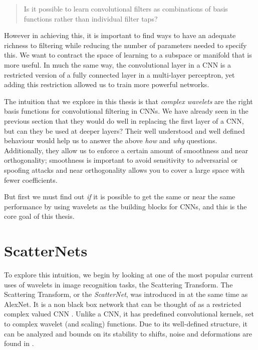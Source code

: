 \begin{quote}
  Is it possible to learn convolutional filters as 
  combinations of basis functions rather than individual filter taps?
\end{quote}

However in achieving this, it is important to find ways to have an adequate
richness to filtering while reducing the number of parameters needed to specify
this. We want to contract the space of learning to a subspace or manifold that 
is more useful. In much the same way, the convolutional layer in a CNN is a restricted
version of a fully connected layer in a multi-layer perceptron, yet adding this
restriction allowed us to train more powerful networks. 

The intuition that we explore in this thesis is that \emph{complex wavelets} are the
right basis functions for convolutional filtering in CNNs. We have already seen in the
previous section that they would do well in replacing the first layer of a CNN,
but can they be used at deeper layers? Their well understood and
well defined behaviour would help us to answer the above \emph{how} and \emph{why}
questions. Additionally, they allow us to enforce a certain amount of smoothness and near
orthogonality; smoothness is important to avoid sensitivity to adversarial or
spoofing attacks \cite{szegedy_intriguing_2014} and near orthogonality
allows you to cover a large space with fewer coefficients.

But first we must find out \emph{if} it is possible to get the same or near the same
performance by using wavelets as the building blocks for CNNs, and this is the
core goal of this thesis. 

\section{ScatterNets}
To explore this intuition, we begin by looking at one of the most
popular current uses of wavelets in image recognition tasks, the
Scattering Transform. 
The Scattering Transform, or the \emph{ScatterNet}, was introduced in \cite{mallat_group_2012,
bruna_invariant_2013} at the same time as AlexNet. It is a non black box
network that can be thought of as a restricted complex valued CNN
\cite{bruna_mathematical_2015}. Unlike a CNN, it has predefined
convolutional kernels, set to complex wavelet (and scaling) functions. Due to
its well-defined structure, it can be analyzed and bounds on its stability to 
shifts, noise and deformations are found in \cite{mallat_group_2012}.
%

